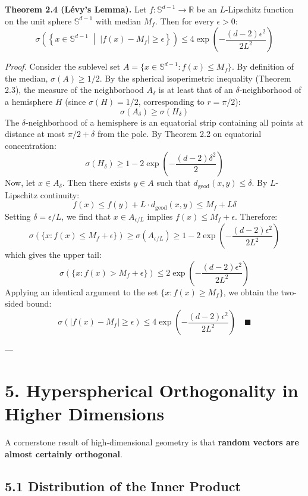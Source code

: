 \documentclass[11pt,twoside,openright]{amsbook}
\begin{document}
\textbf{Theorem 2.4 (Lévy's Lemma).} Let $f \colon \mathbb{S}^{d-1} \to \mathbb{R}$ be an $L$-Lipschitz function on the unit sphere $\mathbb{S}^{d-1}$ with median $M_f$. Then for every $\epsilon > 0$:
$$\sigma\left( \left\{ x \in \mathbb{S}^{d-1} \;\middle|\; |f(x) - M_f| \ge \epsilon \right\} \right) \le 4 \exp\left( - \frac{(d - 2) \epsilon^2}{2 L^2} \right)$$

\textit{Proof.} Consider the sublevel set $A = \{x \in \mathbb{S}^{d-1} : f(x) \le M_f\}$. By definition of the median, $\sigma(A) \ge 1/2$.
By the spherical isoperimetric inequality (Theorem 2.3), the measure of the neighborhood $A_\delta$ is at least that of an $\delta$-neighborhood of a hemisphere $H$ (since $\sigma(H) = 1/2$, corresponding to $r = \pi/2$):
$$\sigma(A_\delta) \ge \sigma(H_\delta)$$
The $\delta$-neighborhood of a hemisphere is an equatorial strip containing all points at distance at most $\pi/2 + \delta$ from the pole. By Theorem 2.2 on equatorial concentration:
$$\sigma(H_\delta) \ge 1 - 2 \exp\left( - \frac{(d - 2) \delta^2}{2} \right)$$
Now, let $x \in A_\delta$. Then there exists $y \in A$ such that $d_{\operatorname{geod}}(x, y) \le \delta$. By $L$-Lipschitz continuity:
$$f(x) \le f(y) + L \cdot d_{\operatorname{geod}}(x, y) \le M_f + L \delta$$
Setting $\delta = \epsilon / L$, we find that $x \in A_{\epsilon/L}$ implies $f(x) \le M_f + \epsilon$. Therefore:
$$\sigma(\{x : f(x) \le M_f + \epsilon\}) \ge \sigma(A_{\epsilon/L}) \ge 1 - 2 \exp\left( - \frac{(d - 2) \epsilon^2}{2 L^2} \right)$$
which gives the upper tail:
$$\sigma(\{x : f(x) > M_f + \epsilon\}) \le 2 \exp\left( - \frac{(d - 2) \epsilon^2}{2 L^2} \right)$$
Applying an identical argument to the set $\{x : f(x) \ge M_f\}$, we obtain the two-sided bound:
$$\sigma(|f(x) - M_f| \ge \epsilon) \le 4 \exp\left( - \frac{(d - 2) \epsilon^2}{2 L^2} \right) \quad \blacksquare$$

---

\section{5. Hyperspherical Orthogonality in Higher Dimensions}

A cornerstone result of high-dimensional geometry is that \textbf{random vectors are almost certainly orthogonal}.

\subsection{5.1 Distribution of the Inner Product}
\end{document}

